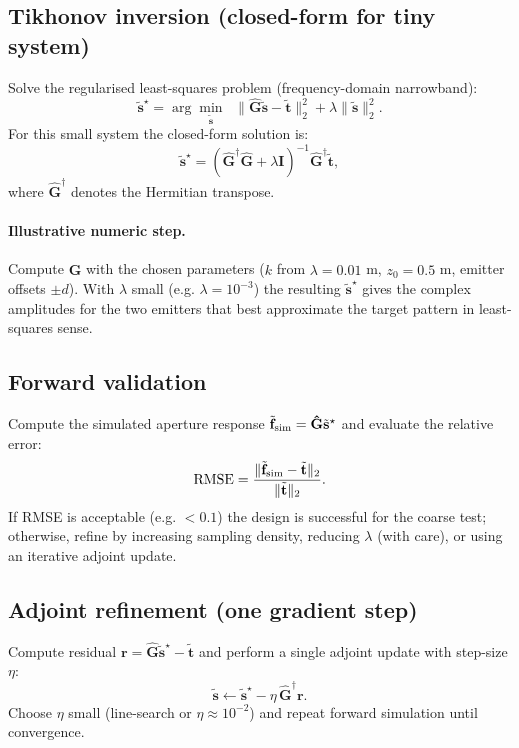 \documentclass[11pt]{article}
\theoremstyle{plain}
\theoremstyle{definition}
\theoremstyle{remark}
\begin{document}
\subsection*{Tikhonov inversion (closed-form for tiny system)}
Solve the regularised least-squares problem (frequency-domain narrowband):
\[
\tilde{\mathbf{s}}^\star
=\arg\min_{\tilde{\mathbf{s}}}
\;\; \|\mathbf{\hat{G}}\tilde{\mathbf{s}} - \tilde{\mathbf{t}}\|_2^2
+ \lambda \|\tilde{\mathbf{s}}\|_2^2.
\]
For this small system the closed-form solution is:
\[
\tilde{\mathbf{s}}^\star
= (\mathbf{\hat{G}}^\dagger \mathbf{\hat{G}} + \lambda \mathbf{I})^{-1}
\mathbf{\hat{G}}^\dagger \tilde{\mathbf{t}},
\]
where \(\mathbf{\hat{G}}^\dagger\) denotes the Hermitian transpose.

\paragraph{Illustrative numeric step.} Compute \(\mathbf{\hat{G}}\) with the
chosen parameters (\(k\) from \(\lambda=0.01\) m, \(z_0=0.5\) m, emitter offsets
\(\pm d\)). With \(\lambda\) small (e.g. \(\lambda=10^{-3}\)) the resulting
\(\tilde{\mathbf{s}}^\star\) gives the complex amplitudes for the two emitters
that best approximate the target pattern in least-squares sense.

\subsection*{Forward validation}
Compute the simulated aperture response \(\tilde{\mathbf{f}}_{\rm sim}=
\mathbf{\hat{G}}\tilde{\mathbf{s}}^\star\) and evaluate the relative error:
\[
\mathrm{RMSE} = \frac{\|\tilde{\mathbf{f}}_{\rm sim} - \tilde{\mathbf{t}}\|_2}
{\|\tilde{\mathbf{t}}\|_2}.
\]
If RMSE is acceptable (e.g. \(<0.1\)) the design is successful for the coarse test;
otherwise, refine by increasing sampling density, reducing \(\lambda\) (with care),
or using an iterative adjoint update.

\subsection*{Adjoint refinement (one gradient step)}
Compute residual \(\mathbf{r}=\mathbf{\hat{G}}\tilde{\mathbf{s}}^\star - \tilde{\mathbf{t}}\)
and perform a single adjoint update with step-size \(\eta\):
\[
\tilde{\mathbf{s}} \leftarrow \tilde{\mathbf{s}}^\star - \eta\,
\mathbf{\hat{G}}^\dagger \mathbf{r}.
\]
Choose \(\eta\) small (line-search or \(\eta\approx 10^{-2}\)) and repeat forward
simulation until convergence.
\end{document}
